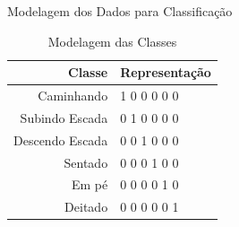 \documentclass{beamer}
\begin{document}
\begin{frame}{Modelagem dos Dados para Classificação}

		\begin{table}[h]
		\centering
		\vspace{0.5cm}
		\begin{tabular}{r|l}
	 
		Classe & Representação \\ %
		\hline                               %
		Caminhando			& 1 0 0 0 0 0\\
		Subindo Escada	& 0 1 0 0 0 0 \\
		Descendo Escada	& 0 0 1 0 0 0 \\
		Sentado				& 0 0 0 1 0 0 \\	
		Em pé					& 0 0 0 0 1 0 \\
		Deitado				& 0 0 0 0 0 1 \\
	
		\end{tabular}
		\caption{Modelagem das Classes}\label{tab:modelagem_das_classes}
		\end{table}
	
\end{frame}

\end{document}

